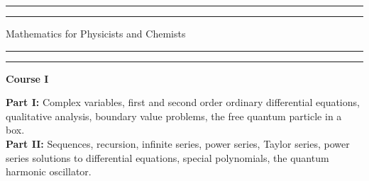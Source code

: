 


\begin{titlepage} %

	\centering %

	\scshape %

	\vspace*{\baselineskip} %


	\rule{\textwidth}{1.6pt}\vspace*{-\baselineskip}\vspace*{2pt} %
	\rule{\textwidth}{0.4pt} %

	\vspace{\baselineskip} %

	{\LARGE Mathematics for Physicists and Chemists} %

	\vspace{0.3\baselineskip} %

	\rule{\textwidth}{0.4pt}\vspace*{-\baselineskip}\vspace{3.2pt} %
	\rule{\textwidth}{1.6pt} %

	\vspace{2\baselineskip} %

	\noindent\textbf{\large{Course I}}

	\noindent\textbf{Part I:} Complex variables, first and second order ordinary differential equations, qualitative analysis, boundary value problems, the free quantum particle in a box.\\

    \noindent\textbf{Part II:} Sequences, recursion, infinite series, power series, Taylor series, power series solutions to differential equations, special polynomials, the quantum harmonic oscillator.\\


\end{titlepage}

